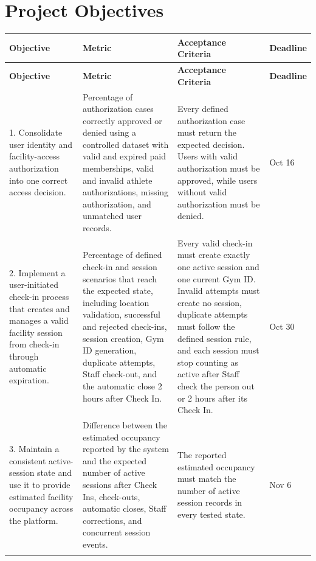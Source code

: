 \section{Project Objectives}

\begin{center}
\small
\begin{longtable}{L{3.1cm} L{4.2cm} L{4.2cm} L{1.8cm}}
\toprule
\textbf{Objective} & \textbf{Metric} & \textbf{Acceptance Criteria} & \textbf{Deadline} \\
\midrule
\endfirsthead
\toprule
\textbf{Objective} & \textbf{Metric} & \textbf{Acceptance Criteria} & \textbf{Deadline} \\
\midrule
\endhead
\bottomrule
\endlastfoot

1. Consolidate user identity and facility-access authorization into one correct access decision.
&
Percentage of authorization cases correctly approved or denied using a controlled dataset with valid and expired paid memberships, valid and invalid athlete authorizations, missing authorization, and unmatched user records.
&
Every defined authorization case must return the expected decision. Users with valid authorization must be approved, while users without valid authorization must be denied.
&
Oct 16 \\
\addlinespace
\midrule
\addlinespace

2. Implement a user-initiated check-in process that creates and manages a valid facility session from check-in through automatic expiration.
&
Percentage of defined check-in and session scenarios that reach the expected state, including location validation, successful and rejected check-ins, session creation, Gym ID generation, duplicate attempts, Staff check-out, and the automatic close 2 hours after Check In.
&
Every valid check-in must create exactly one active session and one current Gym ID. Invalid attempts must create no session, duplicate attempts must follow the defined session rule, and each session must stop counting as active after Staff check the person out or 2 hours after its Check In.
&
Oct 30 \\
\addlinespace
\midrule
\addlinespace

3. Maintain a consistent active-session state and use it to provide estimated facility occupancy across the platform.
&
Difference between the estimated occupancy reported by the system and the expected number of active sessions after Check Ins, check-outs, automatic closes, Staff corrections, and concurrent session events.
&
The reported estimated occupancy must match the number of active session records in every tested state. 
&
Nov 6 \\
\addlinespace
\midrule
\addlinespace


\end{longtable}
\end{center}
